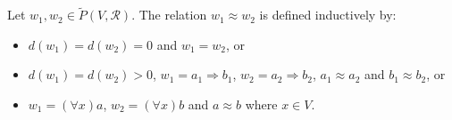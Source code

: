 Let $w_1, w_2 \in \tilde{P}(V, \mathcal{R})$. The relation $w_1 \approx w_2$ is defined inductively by:
\begin{itemize}
\item[(a)] $d(w_1) = d(w_2) = 0$ and $w_1 = w_2$, or
\item[(b)] $d(w_1) = d(w_2) > 0$, $w_1 = a_1 \Rightarrow b_1$, $w_2 = a_2 \Rightarrow b_2$, $a_1 \approx a_2$ and $b_1 \approx b_2$, or
\item[(c)] $w_1 = (\forall x)a$, $w_2 = (\forall x)b$ and $a \approx b$ where $x \in V$.
\end{itemize}

